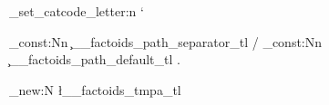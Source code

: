 \usepackage{expl3}
\usepackage{xparse}

\usepackage[warnunknown, fasterrors, mathletters]{ucs}
\usepackage[utf8x]{inputenc}
\usepackage[cm]{fullpage}
\usepackage[english]{babel}
\everymath{\displaystyle}

\usepackage{amsfonts, amsthm, amsmath, amssymb}
\usepackage{mathtools}  %
\usepackage[fontsize=14pt]{scrextend}

\usepackage{cancel, textcomp}
\usepackage[mathscr]{euscript}
\usepackage[nointegrals]{wasysym}

\usepackage{physics}  %
\usepackage{tikz-cd}  %
\usetikzlibrary{angles}
\usepackage{color}  %
\usepackage{microtype}  %
\usepackage{mathrsfs}  %
\usepackage{polynom}

\def\mbb#1{\mathbb{#1}}
\def\mfk#1{\mathfrak{#1}}

\def\N{\mbb{N}}
\def\C{\mbb{C}}
\def\R{\mbb{R}}
\def\pr{\mbb{P}}
\def\Q{\mbb{Q}}
\def\Z{\mbb{Z}}

\def\la{\leftarrow}
\def\La{\Leftarrow}
\def\ra{\rightarrow}
\def\Ra{\Rightarrow}
\def\lp{\left(}
\def\rp{\right)}
\def\lk{\left[}
\def\rk{\right]}
\def\lb{\left\{}
\def\rb{\right\}}

\def\del{\nabla}
\def\eps{\varepsilon}
\def\inv{{-1}}
\def\pa{\partial}
\def\vp{\varphi}
\def\y{\infty}
\def\th{\theta}

\newcommand{\func}[3]{#1\colon#2\to#3}
\newcommand{\vfunc}[5]{\func{#1}{#2}{#3},\quad#4\longmapsto#5}
\newcommand{\floor}[1]{\left\lfloor#1\right\rfloor}
\newcommand{\ceil}[1]{\left\lceil#1\right\rceil}
\newcommand{\pdif}[3]{\frac{\partial^{#3}#1}{\partial#2^{#3}}}

\ExplSyntaxOn
\char_set_catcode_letter:n { `\@ }


\tl_const:Nn \c__factoids_path_separator_tl { / }
\tl_const:Nn \c__factoids_path_default_tl   { . }

\tl_new:N \l__factoids_tmpa_tl

